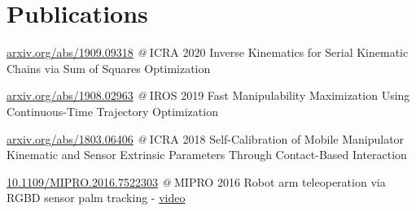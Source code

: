 \documentclass{tccv}
\begin{document}
\section{Publications}
\begin{yearlist2}
\item{}   
     {{\small \href{https://arxiv.org/abs/1909.09318}{arxiv.org/abs/1909.09318} \textit{@} ICRA 2020}}
     {{\small Inverse Kinematics for Serial Kinematic Chains via Sum of Squares Optimization}}

\item{}
     {{\small \href{https://arxiv.org/abs/1908.02963}{arxiv.org/abs/1908.02963} \textit{@} IROS 2019}}
     {{\small Fast Manipulability Maximization Using Continuous-Time Trajectory Optimization}} 
     
\item{}
     {{\small \href{https://arxiv.org/abs/1803.06406}{arxiv.org/abs/1803.06406} \textit{@} ICRA 2018}}
     {{\small Self-Calibration of Mobile Manipulator Kinematic and Sensor Extrinsic Parameters Through Contact-Based Interaction}}

     \item{}
     {{\small \href{https://ieeexplore.ieee.org/document/7522303}{10.1109/MIPRO.2016.7522303} \textit{@} MIPRO 2016}}
     { Robot arm teleoperation via RGBD sensor palm tracking - \href{https://youtu.be/exf7TUviuSg}{video}}
\end{yearlist2}
\vspace*{-0.5cm}
%
\end{document}
